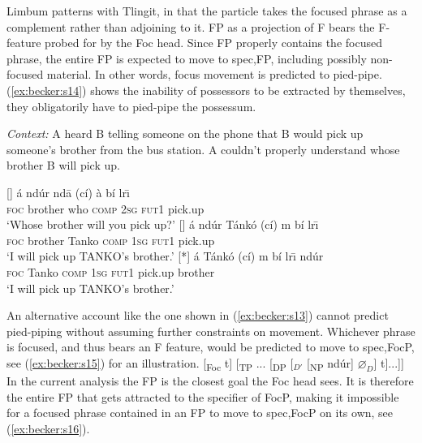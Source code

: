 \documentclass[output=paper,
modfonts
]{langscibook}
\begin{document}
Limbum patterns with Tlingit, in that the particle takes the focused phrase as a complement rather than adjoining to it. FP as a projection of F bears the F-feature probed for by the Foc head. Since FP properly contains the focused phrase, the entire FP is expected to move to spec,FP, including possibly non-focused material. In other words, focus movement is predicted to pied-pipe. (\ref{ex:becker:s14}) shows the inability of possessors to be extracted by themselves, they obligatorily have to pied-pipe the possessum.
\begin{exe}
\ex \textit{Context:} A heard B telling someone on the phone that B would pick up someone's brother from the bus station. A couldn't properly understand whose brother B will pick up.\label{ex:becker:s14}
\begin{xlist}
[]{
\gll \'a nd\'ur nd\=a (c\'i) \`a b\'i lr\={\i} \\  
     \textsc{foc} brother who \textsc{comp} \textsc{2sg} \textsc{fut1} pick.up  \\ 
\glt `Whose brother will you pick up?'}
[]{
\gll \'a {nd\'ur} T\'ank\'o  (c\'i) m b\'i lr\={\i} \\  
     \textsc{foc} {brother} Tanko \textsc{comp} \textsc{1sg} \textsc{fut1} pick.up  \\ 
\glt `I will pick up TANKO's brother.'}
[*]{
\gll \'a {Tánkó} (c\'i) m b\'i lr\={\i} {nd\'ur} \\  
     \textsc{foc}  {Tanko} \textsc{comp} \textsc{1sg} \textsc{fut1} pick.up {brother}  \\ 
\glt `I will pick up TANKO's brother.'}
\end{xlist}
\end{exe}
An alternative account like the one shown in (\ref{ex:becker:s13}) cannot predict pied-piping without assuming further constraints on movement. Whichever phrase is focused, and thus bears an F feature, would be predicted to move to spec,FocP, see (\ref{ex:becker:s15}) for an illustration.
\ea *[... \'a\sub{1} [\textsubscript{FocP} [\textsubscript{DP} Tán\tikzmark{s15f}kó\textsubscript{F}] [\textsubscript{Foc} t] [\textsubscript{TP} ... [\textsubscript{DP} [$_{D'}$ [\textsubscript{NP} nd\'ur] $\varnothing_D$] t]...]]
	 \label{ex:becker:s15}
\z\vspace{6mm}
In the current analysis the FP is the closest goal the Foc head sees. It is therefore the entire FP that gets attracted to the specifier of FocP, making it impossible for a focused phrase contained in an FP to move to spec,FocP on its own, see (\ref{ex:becker:s16}).
\end{document}
